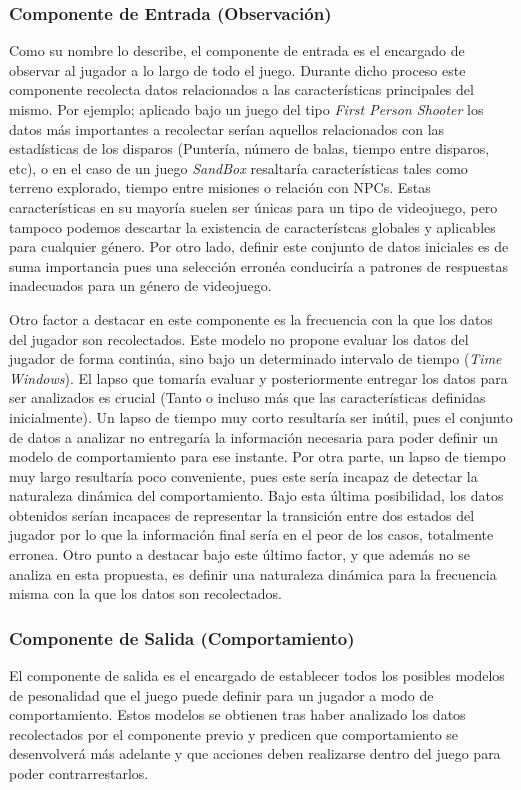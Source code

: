 \documentclass[conference]{IEEEtran}
\begin{document}
\medskip
\subsubsection{Componente de Entrada (Observación)}

Como su nombre lo describe, el componente de entrada es el encargado de observar al jugador a lo largo de todo el juego. Durante dicho proceso este componente recolecta datos relacionados a las características principales del mismo. Por ejemplo; aplicado bajo un juego del tipo \textit{First Person Shooter} los datos más importantes a recolectar serían aquellos  relacionados  con las estadísticas de los disparos (Puntería, número de balas, tiempo entre disparos, etc), o en el caso de un juego \textit{SandBox} resaltaría características tales como terreno explorado, tiempo entre misiones o relación con NPCs. Estas características en su mayoría suelen ser únicas para un tipo de videojuego, pero tampoco podemos descartar la existencia de característcas globales y aplicables para cualquier género. Por otro lado, definir este conjunto de datos iniciales es de suma importancia pues una selección erronéa conduciría a patrones de respuestas inadecuados para un género de videojuego.


Otro factor a destacar en este componente es la frecuencia con la que los datos del jugador son recolectados. Este modelo no propone evaluar los datos del jugador de forma continúa, sino bajo un determinado intervalo de tiempo (\textit{Time Windows}). El lapso que tomaría evaluar y posteriormente entregar los datos para ser analizados es crucial (Tanto o incluso más que las características definidas inicialmente). Un lapso de tiempo muy corto resultaría ser inútil, pues el conjunto de datos a analizar no entregaría la información necesaria para poder definir un modelo de comportamiento para ese instante. Por otra parte, un lapso de tiempo muy largo resultaría poco conveniente, pues este sería incapaz de detectar la naturaleza dinámica del comportamiento. Bajo esta última posibilidad, los datos obtenidos serían incapaces de representar la transición entre dos estados del jugador por lo que la información final sería en el peor de los casos, totalmente erronea. Otro punto a destacar bajo este último factor, y que además no se analiza en esta propuesta, es definir una naturaleza dinámica para la  frecuencia misma con la que los datos son recolectados.  

\medskip
\subsubsection{Componente de Salida (Comportamiento)}
El componente de salida es el encargado de establecer todos los posibles modelos de pesonalidad que el juego puede definir para un jugador a modo de comportamiento. Estos modelos se obtienen tras haber analizado los datos recolectados por el componente previo y predicen que comportamiento se desenvolverá más adelante y que acciones deben realizarse dentro del juego para poder contrarrestarlos. 
\end{document}
